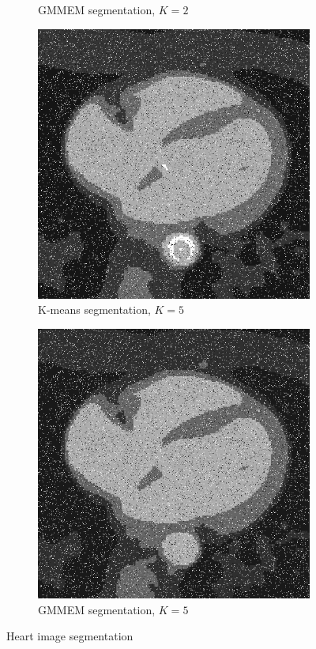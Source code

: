 \documentclass[UTF8]{ctexart}
\begin{document}
\begin{figure}[htbp]
\begin{subfigure}{0.2\textwidth}
        \caption{GMMEM segmentation, $K=2$}
    \end{subfigure}%
    \hfill
    \begin{subfigure}{0.2\textwidth}
        \centering
        \includegraphics[width=\linewidth]{heart_kmeans5.png}
        \caption{K-means segmentation, $K=5$}
    \end{subfigure}%
    \hfill
    \begin{subfigure}{0.2\textwidth}
        \centering
        \includegraphics[width=\linewidth]{heart_gmm5.png}
        \caption{GMMEM segmentation, $K=5$}
    \end{subfigure}
    \caption{Heart image segmentation}
    \label{fig:seg}
\end{figure}
\end{document}
